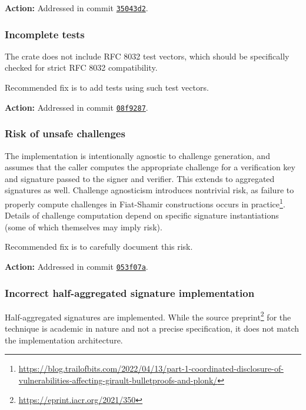 \documentclass{article}
\begin{document}
\textbf{Action:} Addressed in commit \href{https://github.com/serai-dex/serai/commit/35043d28893c0e64529f16a368f859fedf82c452}{\texttt{35043d2}}.


\subsubsection{Incomplete tests}

The crate does not include RFC 8032 test vectors, which should be specifically checked for strict RFC 8032 compatibility.

Recommended fix is to add tests using such test vectors.

\textbf{Action:} Addressed in commit \href{https://github.com/serai-dex/serai/commit/08f92871079926b20a179f9ca415a016e166a4b2}{\texttt{08f9287}}.


\subsubsection{Risk of unsafe challenges}

The implementation is intentionally agnostic to challenge generation, and assumes that the caller computes the appropriate challenge for a verification key and signature passed to the signer and verifier.
This extends to aggregated signatures as well.
Challenge agnosticism introduces nontrivial risk, as failure to properly compute challenges in Fiat-Shamir constructions occurs in practice\footnote{\url{https://blog.trailofbits.com/2022/04/13/part-1-coordinated-disclosure-of-vulnerabilities-affecting-girault-bulletproofs-and-plonk/}}.
Details of challenge computation depend on specific signature instantiations (some of which themselves may imply risk).

Recommended fix is to carefully document this risk.

\textbf{Action:} Addressed in commit \href{https://github.com/serai-dex/serai/commit/053f07a28146d633cfd86011d0a6808b2b816779}{\texttt{053f07a}}.


\subsubsection{Incorrect half-aggregated signature implementation}

Half-aggregated signatures are implemented.
While the source preprint\footnote{\url{https://eprint.iacr.org/2021/350}} for the technique is academic in nature and not a precise specification, it does not match the implementation architecture.
\end{document}
